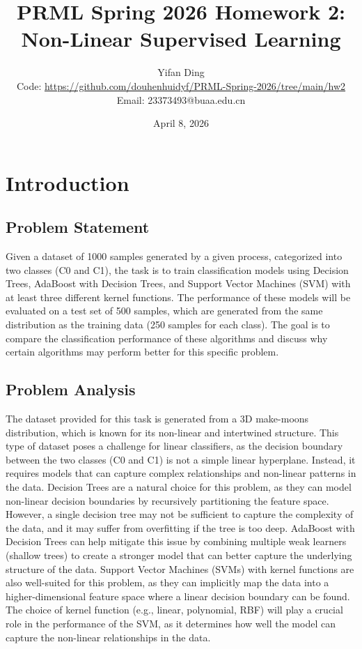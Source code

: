 \documentclass{article}
\title{PRML Spring 2026 Homework 2: Non-Linear Supervised Learning}
\author{Yifan Ding \\
        \small Code: \url{https://github.com/douhenhuidyf/PRML-Spring-2026/tree/main/hw2} \\
        \small Email: 23373493@buaa.edu.cn}
\date{April 8, 2026}
\begin{document}
\maketitle




\section{Introduction}
\subsection{Problem Statement}
Given a dataset of 1000 samples generated by a given process, categorized into two classes (C0 and C1),
 the task is to train classification models using Decision Trees, AdaBoost with Decision Trees, and Support Vector Machines (SVM) with at least three different kernel functions.
 The performance of these models will be evaluated on a test set of 500 samples, which are generated from the same distribution as the training data (250 samples for each class).
 The goal is to compare the classification performance of these algorithms and discuss why certain algorithms may perform better for this specific problem.

\subsection{Problem Analysis}
The dataset provided for this task is generated from a 3D make-moons distribution, which is known for its non-linear and intertwined structure.
This type of dataset poses a challenge for linear classifiers, as the decision boundary between the two classes (C0 and C1) is not a simple linear hyperplane.
Instead, it requires models that can capture complex relationships and non-linear patterns in the data.
Decision Trees are a natural choice for this problem, as they can model non-linear decision boundaries by recursively partitioning the feature space.
However, a single decision tree may not be sufficient to capture the complexity of the data, and it may suffer from overfitting if the tree is too deep.
AdaBoost with Decision Trees can help mitigate this issue by combining multiple weak learners (shallow trees) to create a stronger model that can better capture the underlying structure of the data.
Support Vector Machines (SVMs) with kernel functions are also well-suited for this problem, as they can implicitly map the data into a higher-dimensional feature space where a linear decision boundary can be found.
The choice of kernel function (e.g., linear, polynomial, RBF) will play a crucial role in the performance of the SVM, as it determines how well the model can capture the non-linear relationships in the data.
\end{document}
